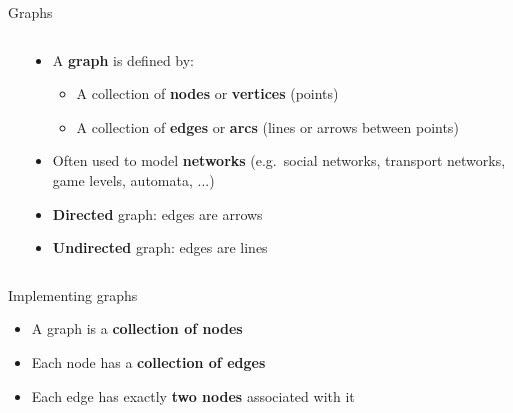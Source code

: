 \begin{frame}{Graphs}
\begin{columns}
\begin{column}{0.3\textwidth}
		\end{column}
		\begin{column}{0.68\textwidth}
			\begin{itemize}
				\pause\item A \textbf{graph} is defined by:
					\begin{itemize}
						\pause\item A collection of \textbf{nodes} or \textbf{vertices} (points)
						\pause\item A collection of \textbf{edges} or \textbf{arcs} (lines or arrows between points)
					\end{itemize}
				\pause\item Often used to model \textbf{networks} (e.g.\ social networks, transport networks, game levels, automata, ...)
				\pause\item \textbf{Directed} graph: edges are arrows
				\pause\item \textbf{Undirected} graph: edges are lines
			\end{itemize}
		\end{column}
	\end{columns}
\end{frame}

\begin{frame}{Implementing graphs}
	\begin{itemize}
		\pause\item A graph is a \textbf{collection of nodes}
		\pause\item Each node has a \textbf{collection of edges}
		\pause\item Each edge has exactly \textbf{two nodes} associated with it
	\end{itemize}
\end{frame}

